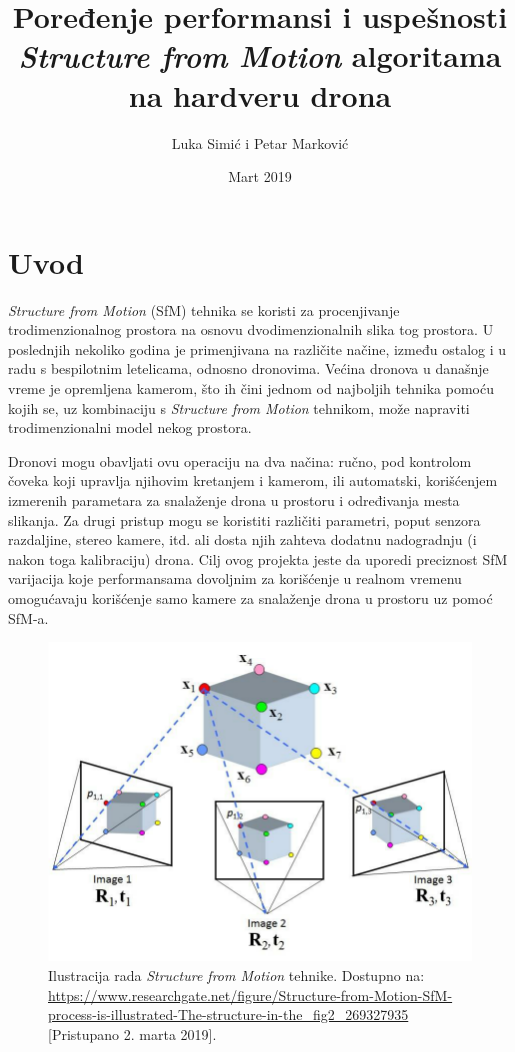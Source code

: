 \documentclass{article}
\title{Poređenje performansi i uspešnosti \textit{Structure from Motion} algoritama na hardveru drona}
\author{Luka Simić i Petar Marković}
\date{Mart 2019}
\begin{document}
\maketitle

\section{Uvod}
    \textit{Structure from Motion} (SfM) tehnika se koristi za procenjivanje trodimenzionalnog prostora na osnovu dvodimenzionalnih slika tog prostora. U poslednjih nekoliko godina je primenjivana na različite načine, između ostalog i u radu s bespilotnim letelicama, odnosno dronovima. Većina dronova u današnje vreme je opremljena kamerom, što ih čini jednom od najboljih tehnika pomoću kojih se, uz kombinaciju s \textit{Structure from Motion} tehnikom, može napraviti trodimenzionalni model nekog prostora.

    Dronovi mogu obavljati ovu operaciju na dva načina: ručno, pod kontrolom čoveka koji upravlja njihovim kretanjem i kamerom, ili automatski, korišćenjem izmerenih parametara za snalaženje drona u prostoru i određivanja mesta slikanja. Za drugi pristup mogu se koristiti različiti parametri, poput senzora razdaljine, stereo kamere, itd. ali dosta njih zahteva dodatnu nadogradnju (i nakon toga kalibraciju) drona. Cilj ovog projekta jeste da uporedi preciznost SfM varijacija koje performansama dovoljnim za korišćenje u realnom vremenu omogućavaju korišćenje samo kamere za snalaženje drona u prostoru uz pomoć SfM-a.

    \begin{figure}
        \centering
        \includegraphics[scale=0.2]{SfM.png}
        \caption{Ilustracija rada \textit{Structure from Motion} tehnike. Dostupno na: \url{https://www.researchgate.net/figure/Structure-from-Motion-SfM-process-is-illustrated-The-structure-in-the_fig2_269327935} [Pristupano 2. marta 2019].}
        \label{SfM}
    \end{figure}
\end{document}
